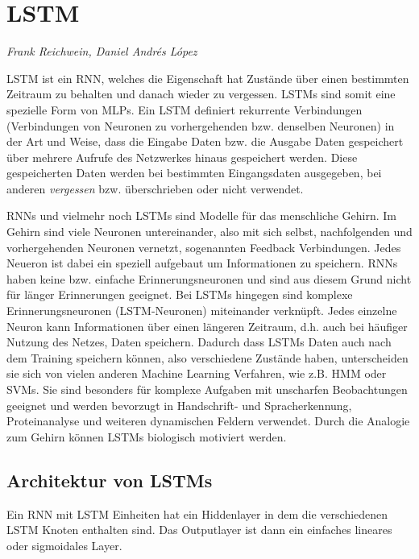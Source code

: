 \section{\acl{LSTM}}
\textit{Frank Reichwein, Daniel Andrés López }

\ac{LSTM} ist ein \ac{RNN}, welches die Eigenschaft hat Zustände über einen
bestimmten Zeitraum zu behalten und danach wieder zu vergessen. \acp{LSTM} sind
somit eine spezielle Form von \acp{MLP}. Ein \ac{LSTM} definiert rekurrente
Verbindungen (Verbindungen von Neuronen zu vorhergehenden bzw. denselben
Neuronen) in der Art und Weise, dass die Eingabe Daten bzw.
die Ausgabe Daten gespeichert über mehrere Aufrufe des Netzwerkes hinaus
gespeichert werden. Diese gespeicherten Daten werden bei bestimmten
Eingangsdaten ausgegeben, bei anderen \textit{vergessen} bzw. überschrieben oder
nicht verwendet. 
  
\acp{RNN} und vielmehr noch \acp{LSTM} sind Modelle für das menschliche Gehirn.
Im Gehirn sind viele Neuronen untereinander, also mit sich selbst, nachfolgenden
und vorhergehenden Neuronen vernetzt, sogenannten Feedback Verbindungen. Jedes
Neueron ist dabei ein speziell aufgebaut um Informationen zu speichern.
\acp{RNN} haben keine bzw. einfache Erinnerungsneuronen und sind aus diesem
Grund nicht für länger Erinnerungen geeignet. Bei \acp{LSTM} hingegen sind
komplexe Erinnerungsneuronen (\ac{LSTM}-Neuronen) miteinander verknüpft. Jedes
einzelne Neuron kann Informationen über einen längeren Zeitraum, d.h. auch bei
häufiger Nutzung des Netzes, Daten speichern. Dadurch dass \acp{LSTM} Daten auch
nach dem Training speichern können, also verschiedene Zustände haben,
unterscheiden sie sich von vielen anderen Machine Learning Verfahren, wie z.B.
\ac{HMM} oder \acp{SVM}. Sie sind besonders für komplexe Aufgaben mit unscharfen
Beobachtungen geeignet und werden bevorzugt in Handschrift- und Spracherkennung,
Proteinanalyse und weiteren dynamischen Feldern verwendet. Durch die Analogie
zum Gehirn können \acp{LSTM} biologisch motiviert werden.
 
\subsection{Architektur von \aclp{LSTM}}
Ein \ac{RNN} mit \ac{LSTM} Einheiten hat ein Hiddenlayer in dem die
verschiedenen \ac{LSTM} Knoten enthalten sind. Das Outputlayer ist dann ein
einfaches lineares oder sigmoidales Layer. 
\clearpage
 
